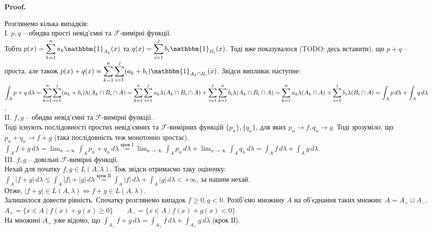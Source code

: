 \documentclass[a4paper, 10pt]{article}
\makeatletter
\theoremstyle{theoremdd}
\renewenvironment{proof}[1][Proof.\\]{\par
\pushQED{\hfill \qed}%
\normalfont \topsep6\p@\@plus6\p@\relax
\trivlist
\item\relax
{\bfseries
#1\@addpunct{.}}\hspace\labelsep\ignorespaces
}{%
\popQED\endtrivlist\@endpefalse
}
\makeatother
\begin{document}
\begin{proof}
Розглянемо кілька випадків:\\
I. $p,q$ -- обидва прості невід'ємні та $\mathcal{F}$-вимірні функції. \\
Тобто $p(x) = \displaystyle\sum_{k=1}^n a_k \mathbbm{1}_{A_k}(x)$ та $q(x) = \displaystyle\sum_{i=1}^j b_i \mathbbm{1}_{B_i}(x)$. Тоді вже показувалося (TODO: десь вставити), що $p+q$ -- проста, але також $p(x)+q(x) = \displaystyle\sum_{k=1}^n \sum_{i=1}^j (a_k + b_i) \mathbbm{1}_{A_k \cap B_i}(x)$. Звідси випливає наступне:\\
$\displaystyle\int_A p+q\,d\lambda = \sum_{k=1}^n \sum_{i=1}^j (a_k+b_i) \lambda(A_k \cap B_i \cap A) = \sum_{k=1}^n \sum_{i=1}^j a_k \lambda(A_k \cap B_i \cap A) + \sum_{i=1}^j \sum_{k=1}^n b_i \lambda(A_k \cap B_i \cap A) \\
= \sum_{k=1}^n a_k \lambda(A_k \cap A) + \sum_{i=1}^j b_i \lambda(B_i \cap A) = \int_A p\,d\lambda + \int_A q\,d\lambda$.
\bigskip \\
II. $f,g$ -- обидва невід'ємні та $\mathcal{F}$-вимірні функції.\\
Тоді існують послідовності простих невід'ємних та $\mathcal{F}$-вимірних функцій $\{p_n\},\{q_n\}$, для яких $p_n \to f, q_n \to g$. Тоді зрозуміло, що $p_n + q_n \to f+g$ (така послідовність теж монотонно зростає).\\
$\displaystyle\int_A f+g\,d\lambda = \lim_{n \to \infty} \int_A p_n+q_n\,d\lambda \overset{\text{крок І}}{=} \lim_{n \to \infty} \int_A p_n\,d\lambda + \lim_{n \to \infty} \int_A q_n\,d\lambda = \int_A f\,d\lambda + \int_A g\,d\lambda$.
\bigskip \\
III. $f,g$ -- довільні $\mathcal{F}$-вимірні функції.\\
Нехай для початку $f,g \in L(A,\lambda)$. Тож звідси отримаємо таку оціночку:\\
$\displaystyle\int_A |f+g|\,d\lambda \leq \int_A |f|+|g|\,d\lambda \overset{\text{крок ІІ}}{=} \int_A |f|\,d\lambda + \int_A |g|\,d\lambda < +\infty$, за нашим нехай. \\
Отже, $|f+g| \in L(A,\lambda) \iff f+g \in L(A,\lambda)$.\\
Залишилося довести рівність. Спочатку розглянемо випадок $f \geq 0, g < 0$. Розіб'ємо множину $A$ на об'єднання таких множин: $A = A_+ \sqcup A_-$.\\
$A_+ = \{x \in A \mid f(x) + g(x) \geq 0\} \qquad A_- = \{x \in A \mid f(x) + g(x) < 0\} $.\\
На множині $A_+$ уже відомо, що $\displaystyle\int_{A_+} f+g\,d\lambda = \int_{A_+} f\,d\lambda + \int_{A_+}g\,d\lambda$ (крок ІІ).\\

\end{proof}
\end{document}
